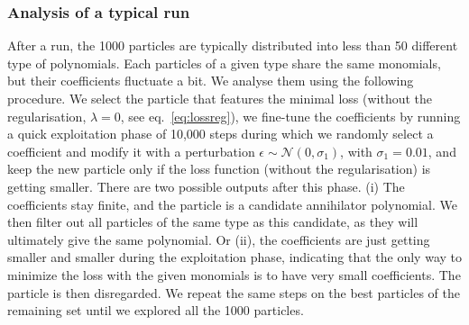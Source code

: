 \documentclass[11pt,a4paper]{article}
\begin{document}
	\subsubsection{Analysis of a typical run}\label{sec:1runanalysis}
	After a run, the 1000 particles are typically distributed into less than 50 different type of polynomials. Each particles of a given type share the same monomials, but their coefficients fluctuate a bit. We analyse them using the following procedure. We select the particle that features the minimal loss (without the regularisation, $\lambda=0$, see eq.~\eqref{eq:lossreg}), we fine-tune the coefficients by running a quick exploitation phase of 10,000 steps during which we randomly select a coefficient and modify it with a perturbation $\epsilon \sim \mathcal{N}(0, \sigma_1)$, with $\sigma_1=0.01$, and keep the new particle only if the loss function (without the regularisation) is getting smaller. There are two possible outputs after this phase. (i) The coefficients stay finite, and the particle is a candidate annihilator polynomial. We then filter out all  particles of the same type as this candidate, as they will ultimately give the same polynomial. Or (ii), the coefficients are just getting smaller and smaller during the exploitation phase, indicating that the only way to minimize the loss with the given monomials is to have very small coefficients. The particle is then disregarded. We repeat the same steps on the best particles of the remaining set until we explored all the 1000 particles.
\end{document}
